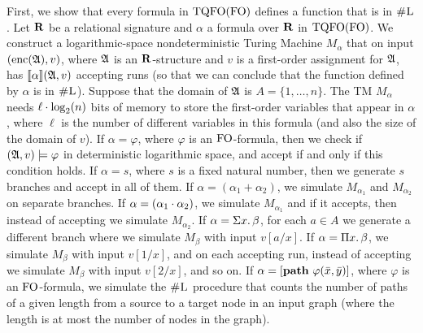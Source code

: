 
First, we show that every formula in ${\rm TQFO}({\rm FO})$ defines a function that is in $\text{\sc \#L}$.
Let $\mathbf{R}$ be a relational signature and $\alpha$ a formula over $\mathbf{R}$ in ${\rm TQFO}({\rm FO})$. We construct a logarithmic-space nondeterministic Turing Machine $M_{\alpha}$ that on input $({\rm enc}(\mathfrak{A}),v)$, where $\mathfrak{A}$ is an $\mathbf{R}$-structure and $v$ is a first-order assignment for $\mathfrak{A}$, has ${\llbracket{}{\alpha}\rrbracket}(\mathfrak{A},v)$ accepting runs (so that we can conclude that the function defined by $\alpha$ is in $\text{\sc \#L}$). Suppose that the domain of $\mathfrak{A}$ is $A = \{1,\ldots,n\}$. The TM $M_{\alpha}$ needs $\ell \cdot\log_2(n)$ bits of memory to store the first-order variables that appear in $\alpha$, where $\ell$ is the number of different variables in this formula (and also the size of the domain of $v$). If $\alpha = \varphi$, where $\varphi$ is an ${\rm FO}$-formula, then we check if $(\mathfrak{A},v)\models\varphi$ in deterministic logarithmic space, and accept if and only if this condition holds. If $\alpha = s$, where $s$ is a fixed natural number, then we generate $s$ branches and accept in all of them. If $\alpha = (\alpha_1 + \alpha_2)$, we simulate $M_{\alpha_1}$ and $M_{\alpha_2}$ on separate branches. If $\alpha = (\alpha_1\cdot\alpha_2)$, we simulate $M_{\alpha_1}$ and if it accepts, then instead of accepting we simulate $M_{\alpha_2}$. If $\alpha = \Sigma{x}.\,\beta$, for each $a\in A$ we generate a different branch where we simulate $M_{\beta}$ with input $v[a/x]$. If $\alpha = \Pi{x}.\,\beta$, we simulate $M_{\beta}$ with input $v[1/x]$, and on each accepting run, instead of accepting we simulate $M_{\beta}$ with input $v[2/x]$, and so on. If $\alpha = [{\bf path} \,\, \varphi(\bar{x},\bar{y})]$, where $\varphi$ is an ${\rm FO}$-formula, we simulate the $\text{\sc \#L}$ procedure that counts the number of paths of a given length from a source to a target node in an input graph (where the length is at most the number of nodes in the graph).

